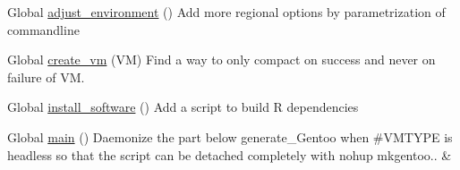 
\begin{DoxyRefList}
\item[Global \mbox{\hyperlink{group__mk_file_system_gaa8c398850ee5921a441408b92f32d477}{adjust\+\_\+environment}} ()]\label{todo__todo000003}%
%
Add more regional options by parametrization of commandline  
\item[Global \mbox{\hyperlink{group__create_installer_ga62f571eb001652243f9d5054d808c1bb}{create\+\_\+vm}} (VM)]\label{todo__todo000001}%
%
Find a way to only compact on success and never on failure of VM.


\item[Global \mbox{\hyperlink{group__mk_file_system_gab693423f511d21225dbc60b2782190c3}{install\+\_\+software}} ()]\label{todo__todo000004}%
%
Add a script to build R dependencies


\item[Global \mbox{\hyperlink{group__create_installer_ga51af30a60f9f02777c6396b8247e356f}{main}} ()]\label{todo__todo000002}%
%
Daemonize the part below generate\+\_\+\+Gentoo when \#\+VMTYPE is {\ttfamily headless} so that the script can be detached completely with {\ttfamily nohup mkgentoo.. \&}


\end{DoxyRefList}